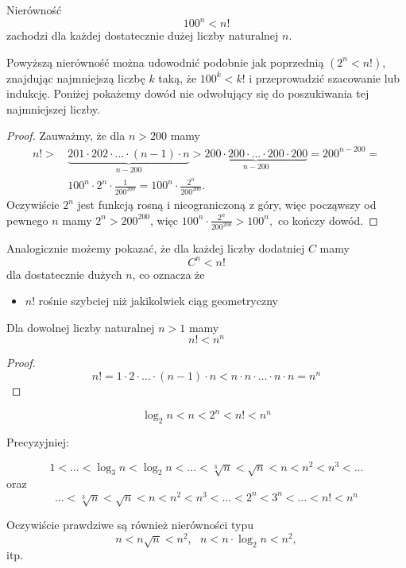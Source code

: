 \documentclass[a4paper,10pt]{beamer}
\begin{document}
\begin{frame}
\begin{block}{}
Nierówność $$100^n<n!$$ zachodzi dla każdej dostatecznie dużej liczby naturalnej $n$.
\end{block}{}

Powyższą nierówność można udowodnić podobnie jak poprzednią $(2^n<n!)$, znajdując najmniejszą liczbę $k$ taką, że $100^k<k!$ i przeprowadzić szacowanie lub indukcję. Poniżej pokażemy dowód nie odwołujący się do poszukiwania tej najmniejszej liczby.

\begin{proof}
Zauważmy, że dla $n>200$ mamy
\begin{align*}
n!>&\,\underbrace{201\cdot202\cdot\ldots\cdot(n-1)\cdot n}_{n-200}>\underbrace{200\cdot200\cdot\ldots\cdot200\cdot200}_{n-200}=200^{n-200}=\\
&\,100^n\cdot2^n\cdot\frac1{200^{200}}=100^n\cdot\frac{2^n}{200^{200}}.
\end{align*}
Oczywiście $2^n$ jest funkcją rosną i nieograniczoną z góry, więc począwszy od pewnego $n$ mamy $2^n>200^{200}$, więc $\displaystyle100^n\cdot\frac{2^n}{200^{200}}>100^n,$ co kończy dowód.
\end{proof}
\end{frame}



\begin{frame}
Analogicznie możemy pokazać, że dla każdej liczby dodatniej $C$ mamy
$$C^n<n!$$
dla dostatecznie dużych $n$, co oznacza że 

\begin{itemize}
\item $n!$ rośnie szybciej niż jakikolwiek ciąg geometryczny
\end{itemize}

\begin{block}{}
Dla dowolnej liczby naturalnej $n>1$ mamy $$n!<n^n$$
\end{block}{}

\begin{proof}
$$n!=1\cdot2\cdot\ldots\cdot(n-1)\cdot n<n\cdot n\cdot\ldots\cdot n\cdot n=n^n$$ 
\end{proof}
\end{frame}

\begin{frame}

\begin{block}{}
$$ \log_2n<n<2^n<n!<n^n$$
\end{block}

\bigskip

Precyzyjniej:
\begin{block}{}
$$1<\ldots<\log_3n<\log_2n<\ldots<\sqrt[3]n<\sqrt{n}<n<n^2<n^3<\ldots$$
oraz
$$\ldots<\sqrt[3]n<\sqrt{n}<n<n^2<n^3<\ldots<2^n<3^n<\ldots<n!<n^n$$
\end{block}

\bigskip

Oczywiście prawdziwe są również nierówności typu
$$n<n\sqrt n<n^2,\ \ \ n<n\cdot\log_2n<n^2,$$
itp.
\end{frame}
\end{document}
